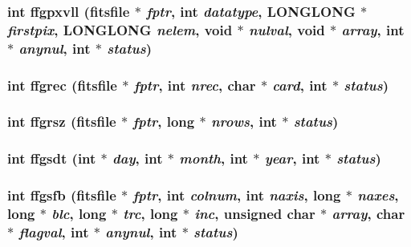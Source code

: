 \subsubsection{\setlength{\rightskip}{0pt plus 5cm}int ffgpxvll (\bf{fitsfile} $\ast$ {\em fptr}, int {\em datatype}, \bf{LONGLONG} $\ast$ {\em firstpix}, \bf{LONGLONG} {\em nelem}, void $\ast$ {\em nulval}, void $\ast$ {\em array}, int $\ast$ {\em anynul}, int $\ast$ {\em status})}\label{fitsio__64_8h_f79f3c5db73c9029a9adde6aaa91688f}


\subsubsection{\setlength{\rightskip}{0pt plus 5cm}int ffgrec (\bf{fitsfile} $\ast$ {\em fptr}, int {\em nrec}, char $\ast$ {\em card}, int $\ast$ {\em status})}\label{fitsio__64_8h_bbb72bc1028b323e8ac34baf8e2dc2b4}


\subsubsection{\setlength{\rightskip}{0pt plus 5cm}int ffgrsz (\bf{fitsfile} $\ast$ {\em fptr}, long $\ast$ {\em nrows}, int $\ast$ {\em status})}\label{fitsio__64_8h_e7f21a30d99f8d7fd38c49d05f0acc62}


\subsubsection{\setlength{\rightskip}{0pt plus 5cm}int ffgsdt (int $\ast$ {\em day}, int $\ast$ {\em month}, int $\ast$ {\em year}, int $\ast$ {\em status})}\label{fitsio__64_8h_e7df3dbfb42a9a6a6a54e6ed084f5f03}


\subsubsection{\setlength{\rightskip}{0pt plus 5cm}int ffgsfb (\bf{fitsfile} $\ast$ {\em fptr}, int {\em colnum}, int {\em naxis}, long $\ast$ {\em naxes}, long $\ast$ {\em blc}, long $\ast$ {\em trc}, long $\ast$ {\em inc}, unsigned char $\ast$ {\em array}, char $\ast$ {\em flagval}, int $\ast$ {\em anynul}, int $\ast$ {\em status})}\label{fitsio__64_8h_eec81cbe16bbd72a2ccc01e2b39ccc19}


